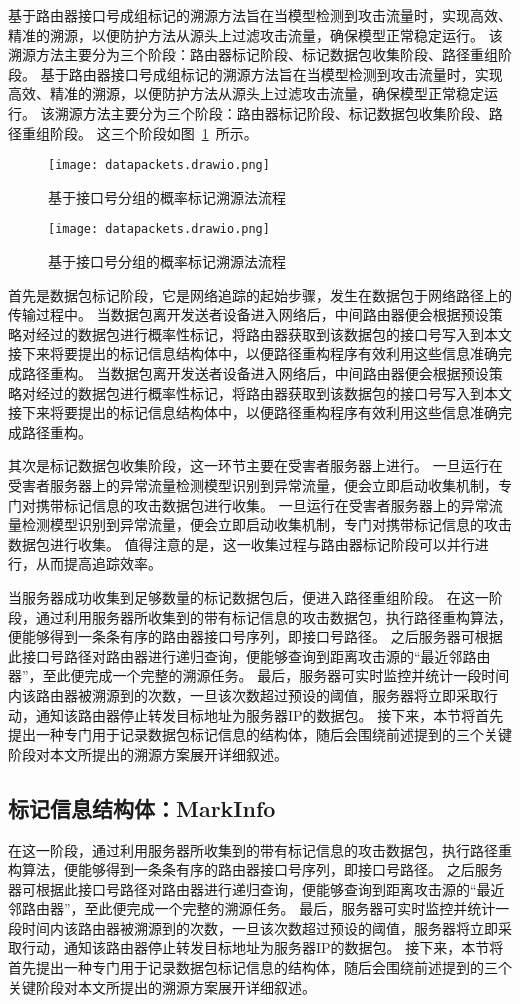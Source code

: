 基于路由器接口号成组标记的溯源方法旨在当模型检测到攻击流量时，实现高效、精准的溯源，以便防护方法从源头上过滤攻击流量，确保模型正常稳定运行。
该溯源方法主要分为三个阶段：路由器标记阶段、标记数据包收集阶段、路径重组阶段。
基于路由器接口号成组标记的溯源方法旨在当模型检测到攻击流量时，实现高效、精准的溯源，以便防护方法从源头上过滤攻击流量，确保模型正常稳定运行。
该溯源方法主要分为三个阶段：路由器标记阶段、标记数据包收集阶段、路径重组阶段。
这三个阶段如图~\ref{fig:our_datapackets_design}~所示。
\begin{figure}[h]
	\centering
	\texttt{[image: datapackets.drawio.png]}
	\caption{基于接口号分组的概率标记溯源法流程}
	\label{fig:our_datapackets_design}
	\centering
	\texttt{[image: datapackets.drawio.png]}
	\caption{基于接口号分组的概率标记溯源法流程}
	\label{fig:our_datapackets_design}
\end{figure}
首先是数据包标记阶段，它是网络追踪的起始步骤，发生在数据包于网络路径上的传输过程中。
当数据包离开发送者设备进入网络后，中间路由器便会根据预设策略对经过的数据包进行概率性标记，将路由器获取到该数据包的接口号写入到本文接下来将要提出的标记信息结构体中，以便路径重构程序有效利用这些信息准确完成路径重构。
当数据包离开发送者设备进入网络后，中间路由器便会根据预设策略对经过的数据包进行概率性标记，将路由器获取到该数据包的接口号写入到本文接下来将要提出的标记信息结构体中，以便路径重构程序有效利用这些信息准确完成路径重构。

其次是标记数据包收集阶段，这一环节主要在受害者服务器上进行。
一旦运行在受害者服务器上的异常流量检测模型识别到异常流量，便会立即启动收集机制，专门对携带标记信息的攻击数据包进行收集。
一旦运行在受害者服务器上的异常流量检测模型识别到异常流量，便会立即启动收集机制，专门对携带标记信息的攻击数据包进行收集。
值得注意的是，这一收集过程与路由器标记阶段可以并行进行，从而提高追踪效率。

当服务器成功收集到足够数量的标记数据包后，便进入路径重组阶段。
在这一阶段，通过利用服务器所收集到的带有标记信息的攻击数据包，执行路径重构算法，便能够得到一条条有序的路由器接口号序列，即接口号路径。
之后服务器可根据此接口号路径对路由器进行递归查询，便能够查询到距离攻击源的“最近邻路由器”，至此便完成一个完整的溯源任务。
最后，服务器可实时监控并统计一段时间内该路由器被溯源到的次数，一旦该次数超过预设的阈值，服务器将立即采取行动，通知该路由器停止转发目标地址为服务器IP的数据包。
接下来，本节将首先提出一种专门用于记录数据包标记信息的结构体，随后会围绕前述提到的三个关键阶段对本文所提出的溯源方案展开详细叙述。
\subsection{标记信息结构体：MarkInfo}
在这一阶段，通过利用服务器所收集到的带有标记信息的攻击数据包，执行路径重构算法，便能够得到一条条有序的路由器接口号序列，即接口号路径。
之后服务器可根据此接口号路径对路由器进行递归查询，便能够查询到距离攻击源的“最近邻路由器”，至此便完成一个完整的溯源任务。
最后，服务器可实时监控并统计一段时间内该路由器被溯源到的次数，一旦该次数超过预设的阈值，服务器将立即采取行动，通知该路由器停止转发目标地址为服务器IP的数据包。
接下来，本节将首先提出一种专门用于记录数据包标记信息的结构体，随后会围绕前述提到的三个关键阶段对本文所提出的溯源方案展开详细叙述。
